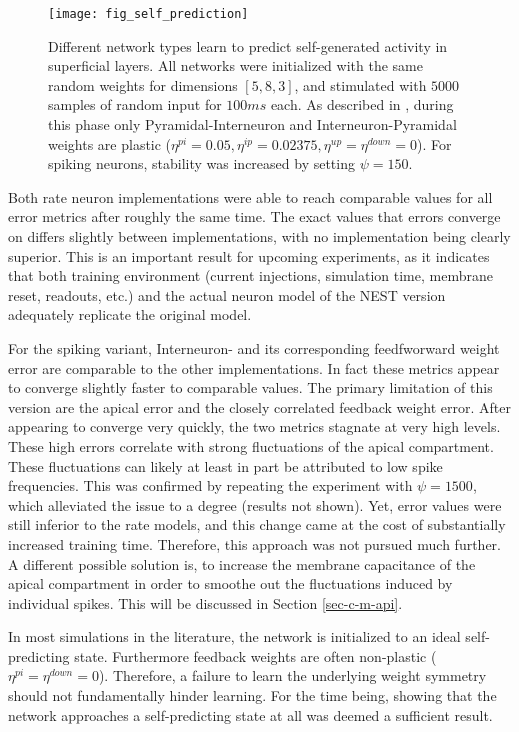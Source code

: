 \begin{figure}[t]
    \centering
    \texttt{[image: fig\_self\_prediction]}
    \caption{Different network types learn to predict self-generated activity in superficial layers. All networks were
        initialized with the same random weights for dimensions $[5, 8, 3]$, and stimulated with $5000$ samples of
        random input for $100ms$ each. As described in \cite{sacramento2018dendritic}, during this phase only
        Pyramidal-Interneuron and Interneuron-Pyramidal weights are plastic ($\eta^{pi}=0.05, \eta^{ip}=0.02375,
        \eta^{up}=\eta^{down}=0$). For spiking neurons, stability was increased by setting $\psi=150$.}
    \label{fig-self-pred}
\end{figure}

Both rate neuron implementations were able to reach comparable values for all error metrics after roughly the same time.
The exact values that errors converge on differs slightly between implementations, with no implementation being clearly
superior. This is an important result for upcoming experiments, as it indicates that both training environment (current
injections, simulation time, membrane reset, readouts, etc.) and the actual neuron model of the NEST version adequately
replicate the original model.

For the spiking variant, Interneuron- and its corresponding feedfworward weight error are comparable to the other
implementations. In fact these metrics appear to converge slightly faster to comparable values. The primary limitation
of this version are the apical error and the closely correlated feedback weight error. After appearing to converge very
quickly, the two metrics stagnate at very high levels. These high errors correlate with strong fluctuations of the
apical compartment. These fluctuations can likely at least in part be attributed to low spike frequencies. This was
confirmed by repeating the experiment with $\psi=1500$, which alleviated the issue to a degree (results not shown). Yet,
error values were still inferior to the rate models, and this change came at the cost of substantially increased
training time. Therefore, this approach was not pursued much further. A different possible solution is, to increase the
membrane capacitance of the apical compartment in order to smoothe out the fluctuations induced by individual spikes.
This will be discussed in Section \ref{sec-c-m-api}.

In most simulations in the literature, the network is initialized to an ideal self-predicting state. Furthermore
feedback weights are often non-plastic ($\eta^{pi}=\eta^{down}=0$). Therefore, a failure to learn the underlying weight
symmetry should not fundamentally hinder learning. For the time being, showing that the network approaches a
self-predicting state at all was deemed a sufficient result.


